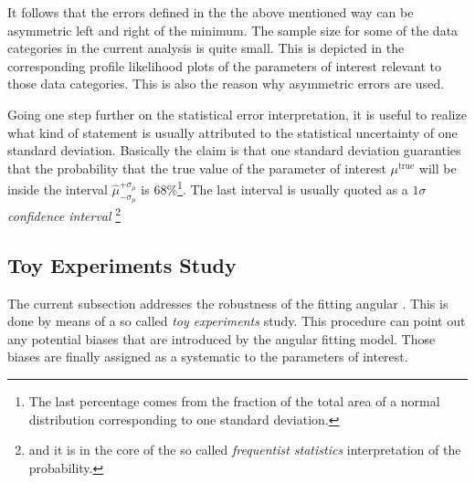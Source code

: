 It follows that the errors defined in the the above mentioned way can be asymmetric left and right of the minimum. 
The sample size for some of the data categories in the current analysis is quite small. This is depicted in the corresponding profile 
likelihood plots of the parameters of interest relevant to those data categories. This is also the reason why asymmetric errors are used. 

Going one step further on the statistical error interpretation, it is useful to realize what kind of statement is usually
attributed to the statistical uncertainty of one standard deviation. Basically the claim is that one standard deviation
guaranties that the probability that the true value of the parameter of interest $\mu^{\text{true}}$ will be inside the
interval $\hat{\mu}_{-\sigma_\mu}^{+\sigma_\mu}$ is $68\%$\footnote{The last percentage comes from the fraction of the total area of a normal distribution corresponding to one standard deviation.}.
The last interval is usually quoted as a $1\sigma$ {\it confidence interval} \footnote{and it is in the core of the so called {\it frequentist statistics}
interpretation of the probability.}





\subsection{Toy Experiments Study}
\label{Toy_Experiments_Study}

The current subsection addresses the robustness of the fitting angular \pdf.
This is done by means of a so called {\it toy experiments} study. This procedure
can point out any potential biases that are introduced by the angular fitting model.
Those biases are finally assigned as a systematic to the parameters of interest.


